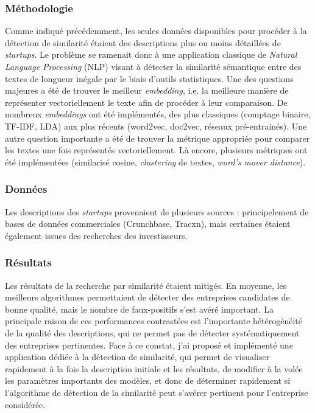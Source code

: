 \subsubsection*{Méthodologie}

Comme indiqué précédemment, les seules données disponibles pour procéder à la détection de similarité étaient des descriptions plus ou moins détaillées de \textit{startups}. Le problème se ramenait donc à une application classique de \textit{Natural Language Processing} (NLP) visant à détecter la similarité sémantique entre des textes de longueur inégale par le biais d'outils statistiques. Une des questions majeures a été de trouver le meilleur \textit{embedding}, i.e. la meilleure manière de représenter vectoriellement le texte afin de procéder à leur comparaison. De nombreux \textit{embeddings} ont été implémentés, des plus classiques (comptage binaire, TF-IDF, LDA) aux plus récents (word2vec, doc2vec, réseaux pré-entrainés). Une autre question importante a été de trouver la métrique appropriée pour comparer les textes une fois représentés vectoriellement. Là encore, plusieurs métriques ont été implémentées (similarisé cosine, \textit{clustering} de textes, \textit{word's mover distance}).

\subsubsection*{Données}

Les descriptions des \textit{startups} provenaient de plusieurs sources : principelement de bases de données commerciales (Crunchbase, Tracxn), mais certaines étaient également issues des recherches des investisseurs.

\subsubsection*{Résultats}

Les résultats de la recherche par similarité étaient mitigés. En moyenne, les meilleurs algorithmes permettaient de détecter des entreprises candidates de bonne qualité, mais le nombre de faux-positifs s'est avéré important. La principale raison de ces performances contrastées est l'importante hétérogénéité de la qualité des descriptions, qui ne permet pas de détecter systématiquement des entreprises pertinentes. Face à ce constat, j'ai proposé et implémenté une application dédiée à la détection de similarité, qui permet de visualiser rapidement à la fois la description initiale et les résultats, de modifier à la volée les paramètres importants des modèles, et donc de déterminer rapidement si l'algorithme de détection de la similarité peut s'avérer pertinent pour l'entreprise considérée.
